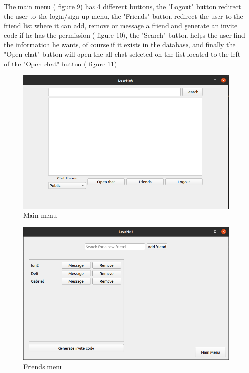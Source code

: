 \documentclass[runningheads]{llncs}
\begin{document}
The main menu ( figure 9) has 4 different buttons, the "Logout" button redirect the user to the login/sign up menu, the "Friends" button redirect the user to the friend list where it can add, remove or message a friend and generate an invite code if he has the permission ( figure 10), the "Search" button helps the user find the information he wants, of course if it exists in the database, and finally the "Open chat" button will open the all chat selected on the list located to the left of the "Open chat" button ( figure 11)

\begin{figure}[H]
\includegraphics[width=\textwidth,height=\textheight,keepaspectratio]{images/mainmenu.png}
\caption{Main menu}
\end{figure}

\begin{figure}[H]
\includegraphics[width=\textwidth,height=\textheight,keepaspectratio]{images/friendsmenu.png}
\caption{Friends menu}
\end{figure}
\end{document}
